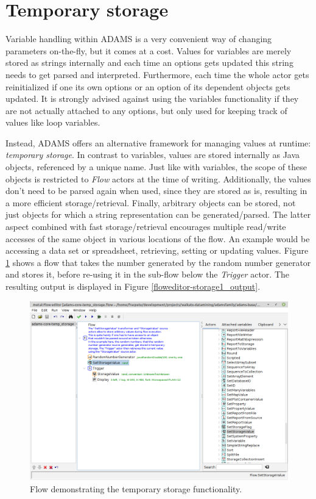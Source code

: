 \newpage
\section{Temporary storage}
\label{temporary_storage}
Variable handling within ADAMS is a very convenient way of changing parameters
on-the-fly, but it comes at a cost. Values for variables are merely stored as
strings internally and each time an options gets updated this string needs to
get parsed and interpreted. Furthermore, each time the whole actor gets
reinitialized if one its own options or an option of its dependent objects gets
updated. It is strongly advised against using the variables functionality if
they are not actually attached to any options, but only used for keeping track
of values like loop variables.

Instead, ADAMS offers an alternative framework for managing values at runtime:
\textit{temporary storage}. In contrast to variables, values are stored
internally as Java objects, referenced by a unique name. Just like with
variables, the scope of these objects is restricted to \textit{Flow} actors at
the time of writing. Additionally, the values don't need to be parsed again
when used, since they are stored as is, resulting in a more efficient
storage/retrieval. Finally, arbitrary objects can be stored, not just objects
for which a string representation can be generated/parsed. The latter aspect
combined with fast storage/retrieval encourages multiple read/write accesses of
the same object in various locations of the flow. An example would be accessing
a data set or spreadsheet, retrieving, setting or updating values. Figure
\ref{floweditor-storage1_flow} shows a flow that takes the number generated by
the random number generator and stores it, before re-using it in the sub-flow
below the \textit{Trigger} actor. The resulting output is displayed in Figure
\ref{floweditor-storage1_output}.

\begin{figure}[htb]
  \centering
  \includegraphics[width=12.0cm]{images/floweditor-storage1_flow.png}
  \caption{Flow demonstrating the temporary storage functionality.}
  \label{floweditor-storage1_flow}
\end{figure}

